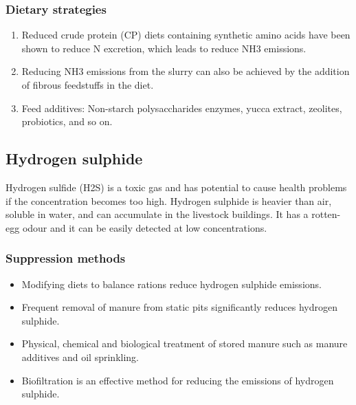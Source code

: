 \documentclass[]{book}
\providecommand{\tightlist}{%
  \setlength{\itemsep}{0pt}\setlength{\parskip}{0pt}}
\begin{document}
\hypertarget{dietary-strategies}{%
\subsubsection{Dietary strategies}\label{dietary-strategies}}

\begin{enumerate}
\def\labelenumi{\arabic{enumi}.}
\tightlist
\item
  Reduced crude protein (CP) diets containing synthetic amino acids have been shown to reduce N excretion, which leads to reduce NH3 emissions.
\item
  Reducing NH3 emissions from the slurry can also be achieved by the addition of fibrous feedstuffs in the diet.
\item
  Feed additives: Non-starch polysaccharides enzymes, yucca extract, zeolites, probiotics, and so on.
\end{enumerate}

\hypertarget{hydrogen-sulphide}{%
\subsection{Hydrogen sulphide}\label{hydrogen-sulphide}}

Hydrogen sulfide (H2S) is a toxic gas and has potential to cause health problems if the concentration becomes too high. Hydrogen sulphide is heavier than air, soluble in water, and can accumulate in the livestock buildings. It has a rotten-egg odour and it can be easily detected at low concentrations.

\hypertarget{suppression-methods-1}{%
\subsubsection{Suppression methods}\label{suppression-methods-1}}

\begin{itemize}
\tightlist
\item
  Modifying diets to balance rations reduce hydrogen sulphide emissions.
\item
  Frequent removal of manure from static pits significantly reduces hydrogen sulphide.
\item
  Physical, chemical and biological treatment of stored manure such as manure additives and oil sprinkling.
\item
  Biofiltration is an effective method for reducing the emissions of hydrogen sulphide.
\end{itemize}
\end{document}
